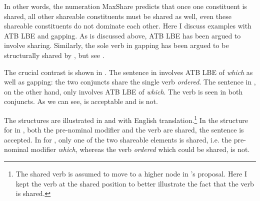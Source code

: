 \documentclass[output=paper]{langscibook}
\begin{document}

In other words, the numeration MaxShare predicts that once one constituent is shared, all other shareable constituents must be shared as well, even these shareable constituents do not dominate each other. Here I discuss examples with ATB LBE and gapping.
As is discussed above, ATB LBE has been argued to involve sharing. 
Similarly, the sole verb in gapping has been argued to be structurally shared by \citet{Citko:2011}, 
but see \citet{Citko:2018}.

 
The crucial contrast is shown in .  
The sentence in  involves ATB LBE of \textit{which} as well as gapping: the two conjuncts share the single verb \textit{ordered}. 
The sentence in , on the other hand, only involves ATB LBE of \textit{which}. The verb is seen in both conjuncts.
As we can see,  is acceptable and  is not. 

\ea 
	\label{shengapAtb}
	\z 
\z 

The structures are illustrated in  and  with English translation.\footnote{The shared verb is assumed to move to a higher node in \citet{Citko:2011}'s proposal. 
Here I kept the verb at the shared position to better illustrate the fact that the verb is shared.}
In the structure for  in , both the pre-nominal modifier and the verb are shared, the sentence is accepted. 
In  for , only one of the two shareable elements is shared, i.e.  the pre-nominal modifier \textit{which}, whereas the verb \textit{ordered} which could be shared, is not.
\end{document}
